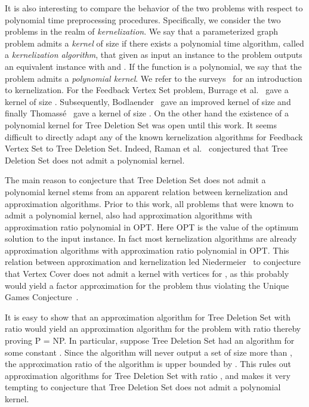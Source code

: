 \documentclass[a4paper,11pt]{article}
\begin{document}
It is also interesting to compare the behavior of the two problems with respect to polynomial time preprocessing procedures. Specifically, we consider the two problems in the realm of {\em kernelization}. We say that a parameterized graph problem admits a {\em kernel} of size  if there exists a polynomial time algorithm, called a {\em kernelization algorithm}, that given as input an instance  to the problem outputs an equivalent instance  with  and . If the function  is a polynomial, we say that the problem admits a {\em polynomial kernel}. We refer to the surveys~\cite{GN07,LokshtanovMS12} for an introduction to kernelization. For the {\sc Feedback Vertex Set} problem, Burrage et al.~\cite{BurrageEFLMR06} gave a kernel of size . Subsequently, Bodlaender~\cite{Bodlaender07} gave an improved kernel of size   and finally Thomass\'{e}~\cite{Thomasse10} gave a kernel of size . On the other hand the existence of a polynomial kernel for {\sc Tree Deletion Set} was open until this work. It seems difficult to directly adapt any of the known kernelization algorithms for {\sc Feedback Vertex Set} to {\sc Tree Deletion Set}. Indeed, Raman et al.~\cite{RamanSS13} conjectured that {\sc Tree Deletion Set} does not admit a polynomial kernel. 

The main reason to conjecture that {\sc Tree Deletion Set} does not admit a polynomial kernel stems from an apparent relation between kernelization and approximation algorithms. Prior to this work, all problems that were known to admit a polynomial kernel, also had approximation algorithms with approximation ratio polynomial in OPT. Here OPT is the value of the optimum solution to the input instance. In fact most kernelization algorithms are already approximation algorithms  with approximation ratio polynomial in OPT. This relation between approximation and kernelization led Niedermeier~\cite{rolf_invitation} to conjecture that {\sc Vertex Cover} does not admit a kernel with  vertices for , as this probably would yield a factor  approximation for the problem thus violating the Unique Games Conjecture~\cite{KhotR08}. 

It is easy to show that an approximation algorithm for {\sc Tree Deletion Set} with ratio  would yield an approximation algorithm for the problem with ratio  thereby proving {\sf P} = {\sf NP}. In particular, suppose {\sc Tree Deletion Set} had an  algorithm for some constant . Since the algorithm will never output a set of size more than , the approximation ratio of the algorithm is upper bounded by . This rules out approximation algorithms for  {\sc Tree Deletion Set} with ratio , and makes it very tempting to conjecture that  {\sc Tree Deletion Set} does not admit a polynomial kernel. 
\end{document}
